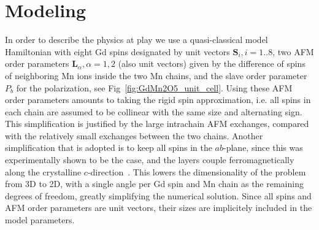 \section{Modeling}
In order to describe the physics at play we use a quasi-classical model Hamiltonian with eight Gd spins designated by unit vectors $\mathbf{S}_i, i=1..8$, two AFM order parameters $\mathbf{L}_\alpha, \alpha=1,2$ (also unit vectors) given by the difference of spins of neighboring Mn ions inside the two Mn chains, and the slave order parameter $P_b$ for the polarization, see Fig~\ref{fig:GdMn2O5_unit_cell}.
Using these AFM order parameters amounts to taking the rigid spin approximation, i.e. all spins in each chain are assumed to be collinear with the same size and alternating sign. This simplification is justified by the large intrachain AFM exchanges, compared with the relatively small exchanges between the two chains.
Another simplification that is adopted is to keep all spins in the $ab$-plane, since this was experimentally shown to be the case, and the layers couple ferromagnetically along the crystalline $c$-direction~\cite{Lee13}.
This lowers the dimensionality of the problem from 3D to 2D, with a single angle per Gd spin and Mn chain as the remaining degrees of freedom, greatly simplifying the numerical solution.
Since all spins and AFM order parameters are unit vectors, their sizes are implicitely included in the model parameters.

